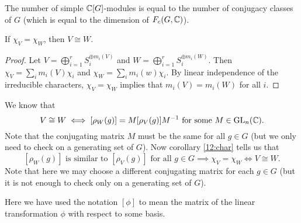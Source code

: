 \begin{cor}
	The number of simple $\mathbb{C}[G]$-modules is equal to the number of conjugacy classes of $G$ (which is equal to the dimension of $F_c(G,\mathbb{C})$).
\end{cor}

\begin{cor}\label{12:char}
	If $\chi_V=\chi_W$, then $V \cong W$.
\end{cor}

\begin{proof}
	Let $V = \bigoplus_{i=1}^r S_i^{\oplus m_i(V)}$ and $W = \bigoplus_{i=1}^r S_i^{\oplus m_i(W)}$.
	Then $\chi_V = \sum_i m_i(V)\chi_i$ and $\chi_W = \sum_i m_i(w)\chi_i$.
	By linear independence of the irreducible characters, $\chi_V=\chi_W$ implies that $m_i(V)=m_i(W)$ for all $i$.
\end{proof}

\begin{rmk}
	We know that
	\[V \cong W \iff [\rho_W(g)] = M[\rho_V(g)]M^{-1} \text{ for some } M \in \operatorname{GL}_n(\mathbb{C}).\]
	Note that the conjugating matrix $M$ must be the same for all $g \in G$ (but we only need to check on a generating set of $G$).
	Now corollary \ref{12:char} tells us that
	\[[\rho_W(g)] \text{ is similar to } [\rho_V(g)] \text{ for all } g \in G \implies \chi_V =\chi_W \iff V \cong W.\]
	Note that here we may choose a different conjugating matrix for each $g \in G$ (but it is not enough to check only on a generating set of $G$).
	
	Here we have used the notation $[\phi]$ to mean the matrix of the linear transformation $\phi$ with respect to some basis.
\end{rmk}
